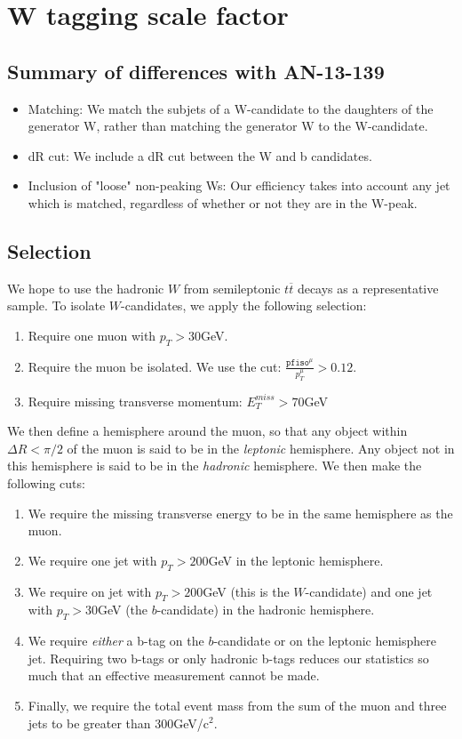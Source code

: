\clearpage
\section{W tagging scale factor}
\subsection{Summary of differences with AN-13-139}
\begin{itemize}
\item
Matching: We match the subjets of a W-candidate to the daughters of the generator W, rather than matching the generator W to the W-candidate.
\item
dR cut: We include a dR cut between the W and b candidates.
\item
Inclusion of "loose" non-peaking Ws: Our efficiency takes into account any jet which is matched, regardless of whether or not they are in the W-peak.
\end{itemize}
\subsection{Selection}
We hope to use the hadronic $W$ from semileptonic $t\overline{t}$ decays as a representative sample. To isolate $W$-candidates, we apply the following selection:
\begin{enumerate}
\item
Require one muon with $p_T > 30$GeV.
\item
Require the muon be isolated. We use the cut: $\frac{\texttt{pfiso}^\mu}{p^\mu_T} > 0.12$.
\item
Require missing transverse momentum: $E^{miss}_T > 70$GeV 
\end{enumerate}
We then define a hemisphere around the muon, so that any object within $\Delta R < \pi/2$ of the muon is said to be in the \textit{leptonic} hemisphere. Any object not in this hemisphere is said to be in the \textit{hadronic} hemisphere. We then make the following cuts:
\begin{enumerate}
\item
We require the missing transverse energy to be in the same hemisphere as the muon.
\item
We require one jet with $p_T > 200$GeV in the leptonic hemisphere.
\item
We require on jet with $p_T > 200$GeV (this is the $W$-candidate) and one jet with $p_T > 30$GeV (the $b$-candidate) in the hadronic hemisphere.
\item
We require \textit{either} a b-tag on the $b$-candidate or on the leptonic hemisphere jet. Requiring two b-tags or only hadronic b-tags reduces our statistics so much that an effective measurement cannot be made.
\item
Finally, we require the total event mass from the sum of the muon and three jets to be greater than $300$GeV/c$^2$.
\end{enumerate}
